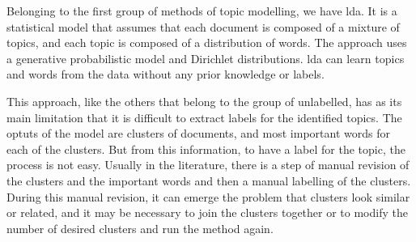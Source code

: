 Belonging to the first group of methods of topic modelling, we have \acrfull{lda}.
%
%
%
It is a statistical model that assumes that each document is composed of a mixture of topics, and each topic is composed of a distribution of words.
The approach uses a generative probabilistic model and Dirichlet distributions.
\acrshort{lda} can learn topics and words from the data without any prior knowledge or labels.




This approach, like the others that belong to the group of unlabelled, has as its main limitation that it is difficult to extract labels for the identified topics.
The optuts of the model are clusters of documents, and most important words for each of the clusters. But from this information, to have a label for the topic, the process is not easy. Usually in the literature, there is a step of manual revision of the clusters and the important words and then a manual labelling of the clusters.
During this manual revision, it can emerge the problem that clusters look similar or related, and it may be necessary to join the clusters together or to modify the number of desired clusters and run the method again.

